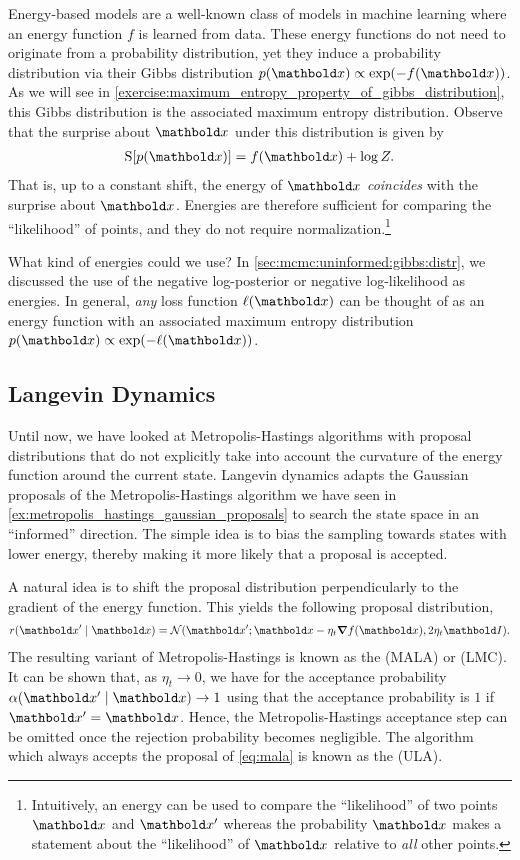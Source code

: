 Energy-based models are a well-known class of models in machine learning where an energy function $f$ is learned from data.
These energy functions do not need to originate from a probability distribution, yet they induce a probability distribution via their Gibbs distribution $p(\vx) \propto \exp(-f(\vx))$.
As we will see in \cref{exercise:maximum_entropy_property_of_gibbs_distribution}, this Gibbs distribution is the associated maximum entropy distribution.
Observe that the surprise about $\vx$ under this distribution is given by \begin{align}
  \S{p(\vx)} = f(\vx) + \log Z.
\end{align}
That is, up to a constant shift, the energy of $\vx$ \emph{coincides} with the surprise about $\vx$.
Energies are therefore sufficient for comparing the ``likelihood'' of points, and they do not require normalization.\footnote{Intuitively, an energy can be used to compare the ``likelihood'' of two points $\vx$ and $\vxp$ whereas the probability $\vx$ makes a statement about the ``likelihood'' of $\vx$ relative to \emph{all} other points.}

What kind of energies could we use?
In \cref{sec:mcmc:uninformed:gibbs:distr}, we discussed the use of the negative log-posterior or negative log-likelihood as energies.
In general, \emph{any} loss function $\ell(\vx)$ can be thought of as an energy function with an associated maximum entropy distribution $p(\vx) \propto \exp(-\ell(\vx))$.

\subsection{Langevin Dynamics}

Until now, we have looked at Metropolis-Hastings algorithms with proposal distributions that do not explicitly take into account the curvature of the energy function around the current state. Langevin dynamics adapts the Gaussian proposals of the Metropolis-Hastings algorithm we have seen in \cref{ex:metropolis_hastings_gaussian_proposals} to search the state space in an ``informed'' direction.
The simple idea is to bias the sampling towards states with lower energy, thereby making it more likely that a proposal is accepted.

A natural idea is to shift the proposal distribution perpendicularly to the gradient of the energy function.
This yields the following proposal distribution, \begin{align}
  r(\vxp \mid \vx) = \N[\vxp]{\vx - \eta_t \grad f(\vx)}{2 \eta_t \mI}. \label{eq:mala}
\end{align}
The resulting variant of Metropolis-Hastings is known as the  (MALA) or  (LMC).
It can be shown that, as $\eta_t \to 0$, we have for the acceptance probability $\alpha(\vxp \mid \vx) \to 1$ using that the acceptance probability is $1$ if $\vxp = \vx$.
Hence, the Metropolis-Hastings acceptance step can be omitted once the rejection probability becomes negligible.
The algorithm which always accepts the proposal of \cref{eq:mala} is known as the  (ULA).

